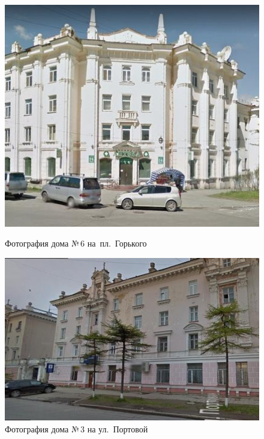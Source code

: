\begin{figure}[H]
  \begin{center}
    \begin{minipage}[h]{0.38\linewidth}
        \includegraphics[width=1\textwidth]{authors/sydchak-fig-1.jpg}
        \caption{Фотография дома №\,6 на~пл.~Горького}
        \label{fig:sydchak-fig-1}
    \end{minipage}
\hfill
    \begin{minipage}[h]{0.50\linewidth}
        \includegraphics[width=1\textwidth]{authors/sydchak-fig-2.jpg}
        \caption{Фотография дома №\,3 на ул.~Портовой}
        \label{fig:sydchak-fig-2}
    \end{minipage}


  \end{center}

\end{figure}
